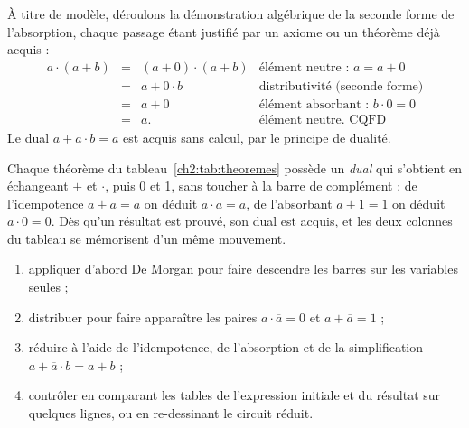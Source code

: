 À titre de modèle, déroulons la démonstration algébrique de la seconde forme de l'absorption, chaque passage étant justifié par un axiome ou un théorème déjà acquis :
\[
\begin{array}{rcll}
a \cdot (a + b) &=& (a + 0) \cdot (a + b) & \text{élément neutre : } a = a + 0\\
&=& a + 0 \cdot b & \text{distributivité (seconde forme)}\\
&=& a + 0 & \text{élément absorbant : } b \cdot 0 = 0\\
&=& a . & \text{élément neutre. CQFD}
\end{array}
\]
Le dual $a + a \cdot b = a$ est acquis sans calcul, par le principe de dualité.

\begin{remarque}
Chaque théorème du tableau~\ref{ch2:tab:theoremes} possède un \emph{dual} qui s'obtient en échangeant $+$ et $\cdot$, puis 0 et 1, sans toucher à la barre de complément : de l'idempotence $a + a = a$ on déduit $a \cdot a = a$, de l'absorbant $a + 1 = 1$ on déduit $a \cdot 0 = 0$. Dès qu'un résultat est prouvé, son dual est acquis, et les deux colonnes du tableau se mémorisent d'un même mouvement.
\end{remarque}

\begin{methode}
\begin{enumerate}
  \item appliquer d'abord De Morgan pour faire descendre les barres sur les variables seules ;
  \item distribuer pour faire apparaître les paires $a \cdot \overline{a} = 0$ et $a + \overline{a} = 1$ ;
  \item réduire à l'aide de l'idempotence, de l'absorption et de la simplification $a + \overline{a} \cdot b = a + b$ ;
  \item contrôler en comparant les tables de l'expression initiale et du résultat sur quelques lignes, ou en re-dessinant le circuit réduit.
\end{enumerate}
\end{methode}

